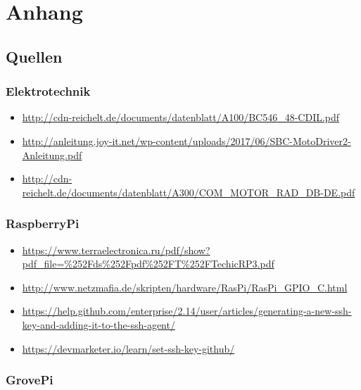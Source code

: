 \documentclass{report}
\begin{document}
\chapter{Anhang}

\section{Quellen}

\subsection{Elektrotechnik}
\begin{itemize}

\item \url{http://cdn-reichelt.de/documents/datenblatt/A100/BC546_48-CDIL.pdf}


\item \url{http://anleitung.joy-it.net/wp-content/uploads/2017/06/SBC-MotoDriver2-Anleitung.pdf}

\item \url{http://cdn-reichelt.de/documents/datenblatt/A300/COM_MOTOR_RAD_DB-DE.pdf}

\end{itemize}

\subsection{RaspberryPi}

\begin{itemize}

\item \url{https://www.terraelectronica.ru/pdf/show?pdf_file=%252Fds%252Fpdf%252FT%252FTechicRP3.pdf}

\item \url{http://www.netzmafia.de/skripten/hardware/RasPi/RasPi_GPIO_C.html}

\item \url{https://help.github.com/enterprise/2.14/user/articles/generating-a-new-ssh-key-and-adding-it-to-the-ssh-agent/}

\item \url{https://devmarketer.io/learn/set-ssh-key-github/}

\end{itemize}

\subsection{GrovePi}
\end{document}
